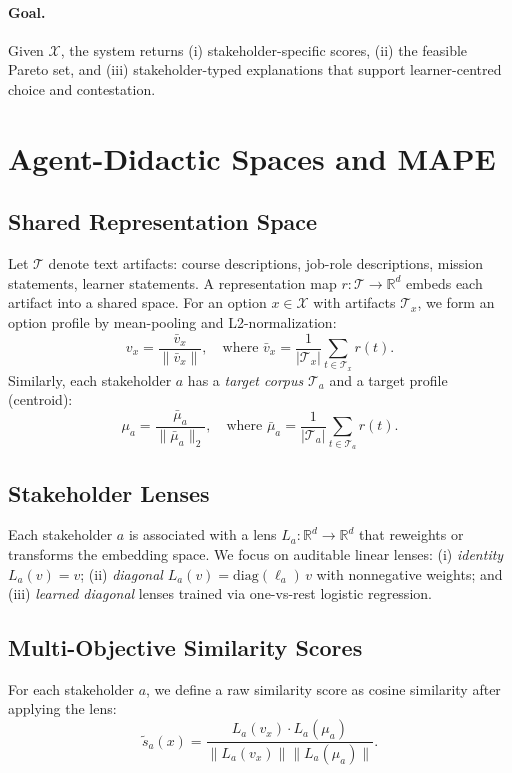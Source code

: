 \documentclass[sigconf,review]{acmart}
\newcommand{\MAPE}{\textsc{MAPE}\xspace}
\begin{document}
\paragraph{Goal.}
Given $\mathcal{X}$, the system returns (i) stakeholder-specific scores, (ii) the feasible Pareto set, and (iii) stakeholder-typed explanations that support learner-centred choice and contestation.


\section{Agent-Didactic Spaces and \MAPE}
\label{sec:method}

\subsection{Shared Representation Space}
Let $\mathcal{T}$ denote text artifacts: course descriptions, job-role descriptions, mission statements, learner statements. A representation map $r:\mathcal{T}\to\mathbb{R}^d$ embeds each artifact into a shared space. For an option $x\in\mathcal{X}$ with artifacts $\mathcal{T}_x$, we form an option profile by mean-pooling and L2-normalization:
\begin{equation}
  v_x = \frac{\bar{v}_x}{\|\bar{v}_x\|}, \quad \text{where } \bar{v}_x = \frac{1}{|\mathcal{T}_x|}\sum_{t\in\mathcal{T}_x} r(t).
\end{equation}
Similarly, each stakeholder $a$ has a \emph{target corpus} $\mathcal{T}_a$ and a target profile (centroid):
\begin{equation}
  \mu_a = \frac{\bar{\mu}_a}{\|\bar{\mu}_a\|_2}, \quad \text{where } \bar{\mu}_a = \frac{1}{|\mathcal{T}_a|}\sum_{t\in\mathcal{T}_a} r(t).
\end{equation}

\subsection{Stakeholder Lenses}
Each stakeholder $a$ is associated with a lens $L_a:\mathbb{R}^d \to \mathbb{R}^d$ that reweights or transforms the embedding space. We focus on auditable linear lenses: (i) \emph{identity} $L_a(v)=v$; (ii) \emph{diagonal} $L_a(v)=\mathrm{diag}(\ell_a)\,v$ with nonnegative weights; and (iii) \emph{learned diagonal} lenses trained via one-vs-rest logistic regression.

\subsection{Multi-Objective Similarity Scores}
\label{subsec:scores}
For each stakeholder $a$, we define a raw similarity score as cosine similarity after applying the lens:
\begin{equation}
  \tilde{s}_a(x) = \frac{L_a(v_x) \cdot L_a(\mu_a)}{\|L_a(v_x)\| \|L_a(\mu_a)\|}.
\end{equation}
\end{document}

